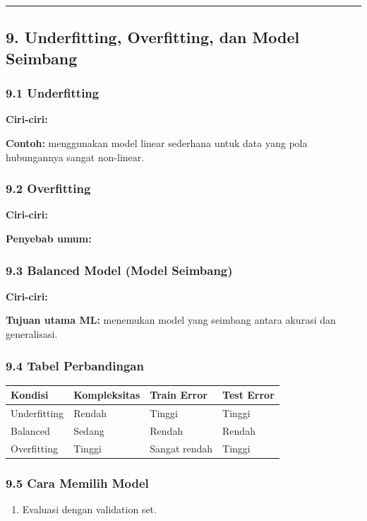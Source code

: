 \documentclass[12pt,a4paper]{article}
\begin{document}
\hrule


\subsection{9. Underfitting, Overfitting, dan Model Seimbang}

\subsubsection{9.1 Underfitting}

\textbf{Ciri-ciri:}


\textbf{Contoh:} menggunakan model linear sederhana untuk data yang pola hubungannya sangat non-linear.


\subsubsection{9.2 Overfitting}

\textbf{Ciri-ciri:}


\textbf{Penyebab umum:}


\subsubsection{9.3 Balanced Model (Model Seimbang)}

\textbf{Ciri-ciri:}


\textbf{Tujuan utama ML:} menemukan model yang seimbang antara akurasi dan generalisasi.


\subsubsection{9.4 Tabel Perbandingan}

\begin{tabular}{|l|l|l|l|}
\hline
Kondisi & Kompleksitas & Train Error & Test Error \\
\hline
Underfitting & Rendah & Tinggi & Tinggi \\
\hline
Balanced & Sedang & Rendah & Rendah \\
\hline
Overfitting & Tinggi & Sangat rendah & Tinggi \\
\hline
\end{tabular}


\subsubsection{9.5 Cara Memilih Model}

\begin{enumerate}
\item Evaluasi dengan validation set.
\end{enumerate}
\end{document}
